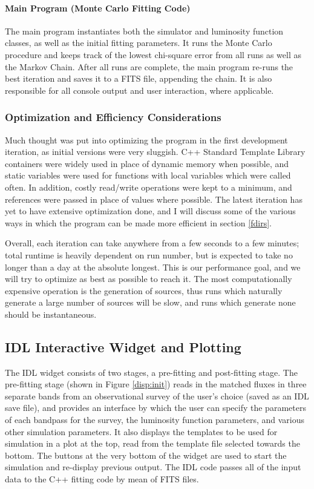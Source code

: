 \documentclass[twocolumn,letterpaper,10pt]{article}
\begin{document}
\paragraph{Main Program (Monte Carlo Fitting Code)}

The main program instantiates both the simulator and luminosity function classes, as well as the initial fitting parameters. It runs the Monte Carlo procedure and keeps track of the lowest chi-square error from all runs as well as the Markov Chain. After all runs are complete, the main program re-runs the best iteration and saves it to a FITS file, appending the chain. It is also responsible for all console output and user interaction, where applicable.

\subsubsection{Optimization and Efficiency Considerations}

Much thought was put into optimizing the program in the first development iteration, as initial versions were very sluggish. C++ Standard Template Library containers were widely used in place of dynamic memory when possible, and static variables were used for functions with local variables which were called often. In addition, costly read/write operations were kept to a minimum, and references were passed in place of values where possible. The latest iteration has yet to have extensive optimization done, and I will discuss some of the various ways in which the program can be made more efficient in section \ref{fdirs}. 

Overall, each iteration can take anywhere from a few seconds to a few minutes; total runtime is heavily dependent on run number, but is expected to take no longer than a day at the absolute longest. This is our performance goal, and we will try to optimize as best as possible to reach it. The most computationally expensive operation is the generation of sources, thus runs which naturally generate a large number of sources will be slow, and runs which generate none should be instantaneous.

\subsection{IDL Interactive Widget and Plotting}

The IDL widget consists of two stages, a pre-fitting and post-fitting stage. The pre-fitting stage (shown in Figure \ref{disp:init}) reads in the matched fluxes in three separate bands from an observational survey of the user's choice (saved as an IDL save file), and provides an interface by which the user can specify the parameters of each bandpass for the survey, the luminosity function parameters, and various other simulation parameters. It also displays the templates to be used for simulation in a plot at the top, read from the template file selected towards the bottom. The buttons at the very bottom of the widget are used to start the simulation and re-display previous output. The IDL code passes all of the input data to the C++ fitting code by mean of FITS files.
\end{document}

